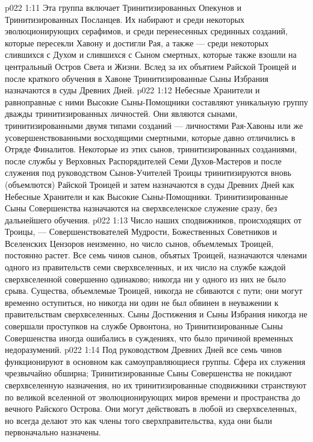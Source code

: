 \vs p022 1:11 \pc {} Эта группа включает Тринитизированных Опекунов и Тринитизированных Посланцев. Их набирают и среди некоторых эволюционирующих серафимов, и среди перенесенных срединных созданий, которые пересекли Хавону и достигли Рая, а также --- среди некоторых слившихся с Духом и слившихся с Сыном смертных, которые также взошли на центральный Остров Света и Жизни. Вслед за их объятием Райской Троицей и после краткого обучения в Хавоне Тринитизированные Сыны Избрания назначаются в суды Древних Дней.
\vs p022 1:12 \pc {} Небесные Хранители и равноправные с ними Высокие Сыны\hyp{}Помощники составляют уникальную группу дважды тринитизированных личностей. Они являются сынами, тринитизированными двумя типами созданий --- личностями Рая\hyp{}Хавоны или же усовершенствованными восходящими смертными, которые давно отличились в Отряде Финалитов. Некоторые из этих сынов, тринитизированных созданиями, после службы у Верховных Распорядителей Семи Духов\hyp{}Мастеров и после служения под руководством Сынов\hyp{}Учителей Троицы тринитизируются вновь (объемлются) Райской Троицей и затем назначаются в суды Древних Дней как Небесные Хранители и как Высокие Сыны\hyp{}Помощники. Тринитизированные Сыны Совершенства назначаются на сверхвселенское служение сразу, без дальнейшего обучения.
\vs p022 1:13 \pc Число наших сподвижников, происходящих от Троицы, --- Совершенствователей Мудрости, Божественных Советников и Вселенских Цензоров неизменно, но число сынов, объемлемых Троицей, постоянно растет. Все семь чинов сынов, объятых Троицей, назначаются членами одного из правительств семи сверхвселенных, и их число на службе каждой сверхвселенной совершенно одинаково; никогда ни у одного из них не было срыва. Существа, объемлемые Троицей, никогда не сбиваются с пути; они могут временно оступиться, но никогда ни один не был обвинен в неуважении к правительствам сверхвселенных. Сыны Достижения и Сыны Избрания никогда не совершали проступков на службе Орвонтона, но Тринитизированные Сыны Совершенства иногда ошибались в суждениях, что было причиной временных недоразумений.
\vs p022 1:14 Под руководством Древних Дней все семь чинов функционируют в основном как самоуправляющиеся группы. Сфера их служения чрезвычайно обширна; Тринитизированные Сыны Совершенства не покидают сверхвселенную назначения, но их тринитизированные сподвижники странствуют по великой вселенной от эволюционирующих миров времени и пространства до вечного Райского Острова. Они могут действовать в любой из сверхвселенных, но всегда делают это как члены того сверхправительства, куда они были первоначально назначены.
